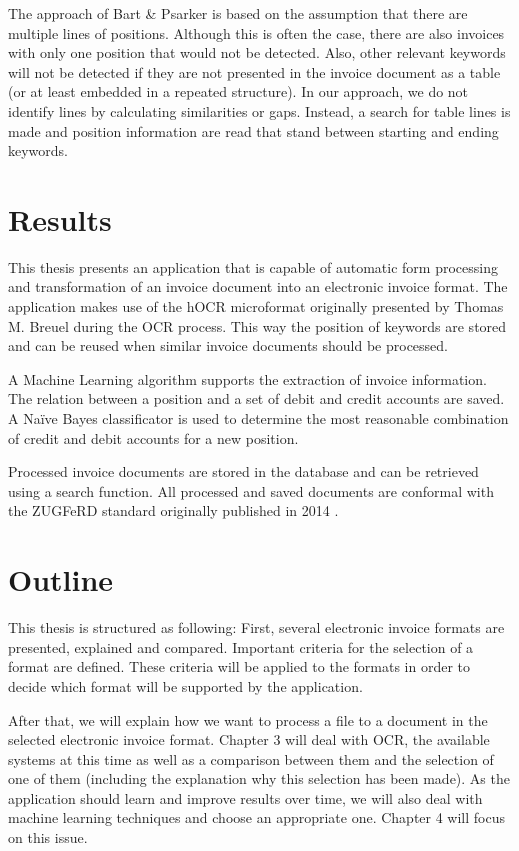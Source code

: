 The approach of Bart \& Psarker \cite{Bart10} is based on the assumption that there are multiple lines of positions. Although this is often the case, there are also invoices with only one position that would not be detected. Also, other relevant keywords will not be detected if they are not presented in the invoice document as a table (or at least embedded in a repeated structure).
In our approach, we do not identify lines by calculating similarities or gaps. Instead, a search for table lines is made and position information are read that stand between starting and ending keywords.

\section{Results}
\label{sec1.5}
This thesis presents an application that is capable of automatic form processing and transformation of an invoice document into an electronic invoice format. The application makes use of the hOCR microformat originally presented by Thomas M. Breuel \cite{Breuel07} during the OCR process. This way the position of keywords are stored and can be reused when similar invoice documents should be processed.

A Machine Learning algorithm supports the extraction of invoice information. The relation between a position and a set of debit and credit accounts are saved. A Na{\"i}ve Bayes classificator is used to determine the most reasonable combination of credit and debit accounts for a new position.

Processed invoice documents are stored in the database and can be retrieved using a search function. All processed and saved documents are conformal with the ZUGFeRD standard originally published in 2014 \cite{Ferd14}.

\section{Outline}
\label{sec1.6}

This thesis is structured as following: First, several electronic invoice formats are presented, explained and compared. Important criteria for the selection of a format are defined. These criteria will be applied to the formats in order to decide which format will be supported by the application.

After that, we will explain how we want to process a file to a document in the selected electronic invoice format. Chapter 3 will deal with OCR, the available systems at this time as well as a comparison between them and the selection of one of them (including the explanation why this selection has been made).
As the application should learn and improve results over time, we will also deal with machine learning techniques and choose an appropriate one. Chapter 4 will focus on this issue.

